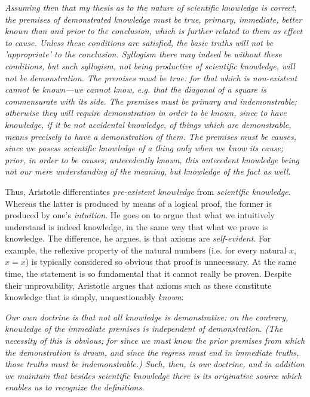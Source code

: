 \begin{tcolorbox}[breakable, enhanced, colback=textbook-blue, sharp corners]
	\begin{displayquote}
		\textit{Assuming then that my thesis as to the nature of scientific knowledge is correct, the premises of demonstrated knowledge must be true, primary, immediate, better known than and prior to the conclusion, which is further related to them as effect to cause. Unless these conditions are satisfied, the basic truths will not be 'appropriate' to the conclusion. Syllogism there may indeed be without these conditions, but such syllogism, not being productive of scientific knowledge, will not be demonstration. The premises must be true: for that which is non-existent cannot be known---we cannot know, e.g. that the diagonal of a square is commensurate with its side. The premises must be primary and indemonstrable; otherwise they will require demonstration in order to be known, since to have knowledge, if it be not accidental knowledge, of things which are demonstrable, means precisely to have a demonstration of them. The premises must be causes, since we posess scientific knowledge of a thing only when we know its cause; prior, in order to be causes; antecedently known, this antecedent knowledge being not our mere understanding of the meaning, but knowledge of the fact as well.}
		\vspace{4mm}
	\end{displayquote}
	
	Thus, Aristotle differentiates \textit{pre-existent knowledge} from \textit{scientific knowledge}. Whereas the latter is produced by means of a logical proof, the former is produced by one's \textit{intuition}. He goes on to argue that what we intuitively understand is indeed knowledge, in the same way that what we prove is knowledge. The difference, he argues, is that axioms are \textit{self-evident}. For example, the reflexive property of the natural numbers (i.e. for every natural $x$, $x=x$) is typically considered so obvious that proof is unnecessary. At the same time, the statement is so fundamental that it cannot really be proven. Despite their unprovability, Aristotle argues that axioms such as these constitute knowledge that is simply, unquestionably \textit{known}: \\
	
	\begin{displayquote}
		\textit{Our own doctrine is that not all knowledge is demonstrative: on the contrary, knowledge of the immediate premises is independent of demonstration. (The necessity of this is obvious; for since we must know the prior premises from which the demonstration is drawn, and since the regress must end in immediate truths, those truths must be indemonstrable.) Such, then, is our doctrine, and in addition we maintain that besides scientific knowledge there is its originative source which enables us to recognize the definitions.}
		\vspace{4mm}
	\end{displayquote}
	

\end{tcolorbox}

